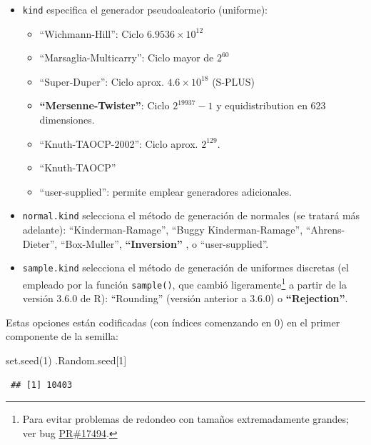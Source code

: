 \documentclass[
  10pt,
]{book}
\newenvironment{Shaded}{\begin{snugshade}}{\end{snugshade}}
\newcommand{\DecValTok}[1]{\textcolor[rgb]{0.00,0.00,0.81}{#1}}
\newcommand{\FunctionTok}[1]{\textcolor[rgb]{0.00,0.00,0.00}{#1}}
\newcommand{\NormalTok}[1]{#1}
\theoremstyle{break}
\theoremstyle{nonumberplain}
\let\oldfootnote\footnote
\renewcommand\footnote[1]{\oldfootnote{\hspace{2mm}#1}}
\begin{document}
\begin{itemize}
\item
  \texttt{kind} especifica el generador pseudoaleatorio (uniforme):

  \begin{itemize}
  \item
    ``Wichmann-Hill'': Ciclo \(6.9536\times10^{12}\)
  \item
    ``Marsaglia-Multicarry'': Ciclo mayor de \(2^{60}\)
  \item
    ``Super-Duper'': Ciclo aprox. \(4.6\times10^{18}\) (S-PLUS)
  \item
    \textbf{``Mersenne-Twister''}: Ciclo \(2^{19937}-1\) y equidistribution
    en 623 dimensiones.
  \item
    ``Knuth-TAOCP-2002'': Ciclo aprox. \(2^{129}\).
  \item
    ``Knuth-TAOCP''
  \item
    ``user-supplied'': permite emplear generadores adicionales.
  \end{itemize}
\item
  \texttt{normal.kind} selecciona el método de generación de normales
  (se tratará más adelante):
  ``Kinderman-Ramage'', ``Buggy Kinderman-Ramage'',
  ``Ahrens-Dieter'', ``Box-Muller'', \textbf{``Inversion''} , o ``user-supplied''.
\item
  \texttt{sample.kind} selecciona el método de generación de uniformes discretas (el empleado por la función \texttt{sample()}, que cambió ligeramente\footnote{Para evitar problemas de redondeo con tamaños extremadamente grandes; ver bug \href{https://bugs.r-project.org/bugzilla3/show_bug.cgi?id=17494}{PR\#17494}.} a partir de la versión 3.6.0 de R): ``Rounding'' (versión anterior a 3.6.0) o \textbf{``Rejection''}.
\end{itemize}

Estas opciones están codificadas (con índices comenzando en 0) en el primer componente de la semilla:

\begin{Shaded}
\begin{Highlighting}[]
\FunctionTok{set.seed}\NormalTok{(}\DecValTok{1}\NormalTok{)}
\NormalTok{.Random.seed[}\DecValTok{1}\NormalTok{]}
\end{Highlighting}
\end{Shaded}

\begin{verbatim}
 ## [1] 10403
\end{verbatim}
\end{document}
